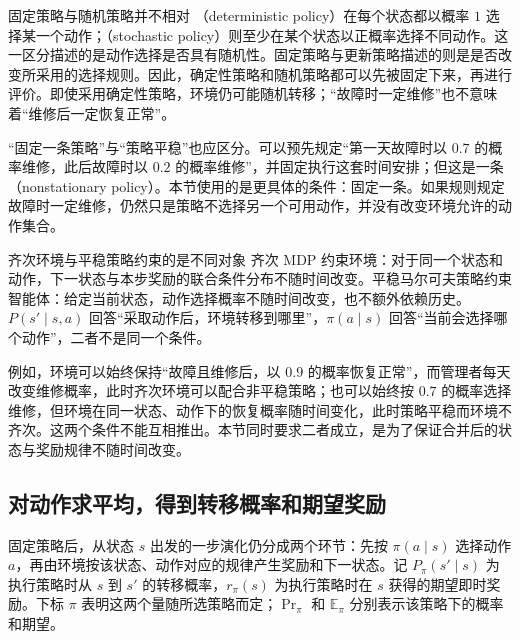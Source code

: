 \documentclass[UTF8]{ctexart}
\begin{document}
\begin{remarkbox}[label={rem:markov-three-fixed-policy}]{固定策略与随机策略并不相对}
（deterministic policy）在每个状态都以概率 $1$ 选择某一个动作；（stochastic policy）则至少在某个状态以正概率选择不同动作。这一区分描述的是动作选择是否具有随机性。固定策略与更新策略描述的则是是否改变所采用的选择规则。因此，确定性策略和随机策略都可以先被固定下来，再进行评价。即使采用确定性策略，环境仍可能随机转移；“故障时一定维修”也不意味着“维修后一定恢复正常”。

\tcblower
“固定一条策略”与“策略平稳”也应区分。可以预先规定“第一天故障时以 $0.7$ 的概率维修，此后故障时以 $0.2$ 的概率维修”，并固定执行这套时间安排；但这是一条（nonstationary policy）。本节使用的是更具体的条件：固定一条。如果规则规定故障时一定维修，仍然只是策略不选择另一个可用动作，并没有改变环境允许的动作集合。
\end{remarkbox}

\begin{remarkbox}[label={rem:markov-three-environment-policy}]{齐次环境与平稳策略约束的是不同对象}
齐次 MDP 约束环境：对于同一个状态和动作，下一状态与本步奖励的联合条件分布不随时间改变。平稳马尔可夫策略约束智能体：给定当前状态，动作选择概率不随时间改变，也不额外依赖历史。$P(s'\mid s,a)$ 回答“采取动作后，环境转移到哪里”，$\pi(a\mid s)$ 回答“当前会选择哪个动作”，二者不是同一个条件。

例如，环境可以始终保持“故障且维修后，以 $0.9$ 的概率恢复正常”，而管理者每天改变维修概率，此时齐次环境可以配合非平稳策略；也可以始终按 $0.7$ 的概率选择维修，但环境在同一状态、动作下的恢复概率随时间变化，此时策略平稳而环境不齐次。这两个条件不能互相推出。本节同时要求二者成立，是为了保证合并后的状态与奖励规律不随时间改变。
\end{remarkbox}

\subsection{对动作求平均，得到转移概率和期望奖励}

固定策略后，从状态 $s$ 出发的一步演化仍分成两个环节：先按 $\pi(a\mid s)$ 选择动作 $a$，再由环境按该状态、动作对应的规律产生奖励和下一状态。记 $P_\pi(s'\mid s)$ 为执行策略时从 $s$ 到 $s'$ 的转移概率，$r_\pi(s)$ 为执行策略时在 $s$ 获得的期望即时奖励。下标 $\pi$ 表明这两个量随所选策略而定；$\Pr_\pi$ 和 $\mathbb E_\pi$ 分别表示该策略下的概率和期望。
\end{document}

